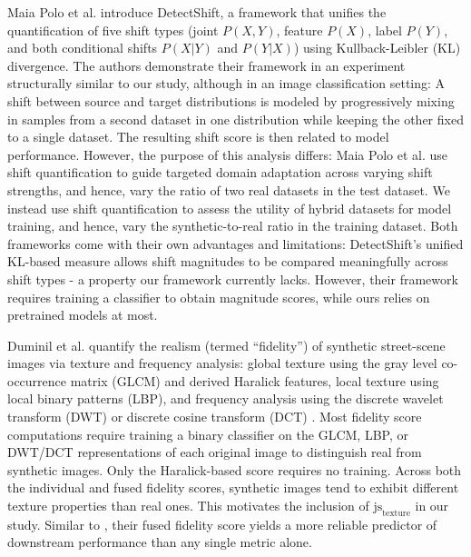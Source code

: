 \documentclass[conference]{IEEEtran}
\begin{document}
Maia Polo et al. \cite{DetectShift} introduce DetectShift, a framework that unifies the quantification of five shift types (joint $P(X,Y)$, feature $P(X)$, label $P(Y)$, and both conditional shifts $P(X|Y)$ and $P(Y|X)$) using Kullback-Leibler (KL) divergence. The authors demonstrate their framework in an experiment structurally similar to our study, although in an image classification setting: A shift between source and target distributions is modeled by progressively mixing in samples from a second dataset in one distribution while keeping the other fixed to a single dataset. The resulting shift score is then related to model performance. 
However, the purpose of this analysis differs: Maia Polo et al. use shift quantification to guide targeted domain adaptation across varying shift strengths, and hence, vary the ratio of two real datasets in the test dataset. We instead use shift quantification to assess the utility of hybrid datasets for model training, and hence, vary the synthetic-to-real ratio in the training dataset.
Both frameworks come with their own advantages and limitations: DetectShift’s unified KL-based measure allows shift magnitudes to be compared meaningfully across shift types - a property our framework currently lacks. However, their framework requires training a classifier to obtain magnitude scores, while ours relies on pretrained models at most. 

Duminil et al. \cite{duminil2024, duminil2025} quantify the realism (termed “fidelity”) of synthetic street-scene images via texture and frequency analysis: global texture using the gray level co-occurrence matrix (GLCM) and derived Haralick features, local texture using local binary patterns (LBP), and frequency analysis using the discrete wavelet transform (DWT) \cite{duminil2024} or discrete cosine transform (DCT) \cite{duminil2025}. Most fidelity score computations require training a binary classifier on the GLCM, LBP, or DWT/DCT representations of each original image to distinguish real from synthetic images. Only the Haralick-based score requires no training. Across both the individual \cite{duminil2024} and fused \cite{duminil2025} fidelity scores, synthetic images tend to exhibit different texture properties than real ones. This motivates the inclusion of $\text{js}_{\text{texture}}$ in our study. Similar to \cite{bartkowiak2026}, their fused fidelity score yields a more reliable predictor of downstream performance than any single metric alone.
\end{document}
